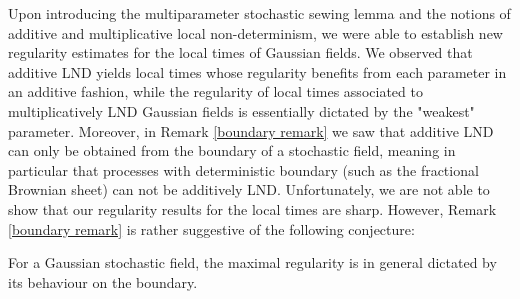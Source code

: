 

Upon introducing the multiparameter stochastic sewing lemma and the notions of additive and multiplicative local non-determinism, we were able to establish new regularity estimates for the local times of Gaussian fields. We observed that additive LND yields local times whose regularity benefits from each parameter in an additive fashion, while the regularity of local times associated to multiplicatively LND Gaussian fields is essentially dictated by the "weakest" parameter. Moreover, in Remark \ref{boundary remark} we saw that additive LND can only be obtained from the boundary of a stochastic field, meaning in particular that processes with deterministic boundary (such as the fractional Brownian sheet) can not be additively LND.  Unfortunately, we are not able to show that our regularity results for the local times are sharp. However, Remark \ref{boundary remark} is rather suggestive of the following conjecture: 
\begin{con}
    For a Gaussian stochastic field, the maximal regularity is in general dictated by its behaviour on the boundary. 
\end{con}

